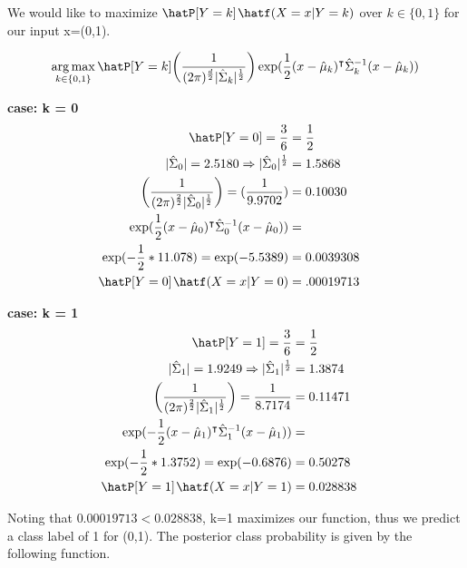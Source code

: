 \documentclass{jhwhw}
\newcommand{\Hat}[1]{\expandafter\hat#1}
\DeclareMathOperator*{\argmax}{arg\,max}
\begin{document}
    \bigbreak
    We would like to maximize $\Hat{P}[Y=k]\hspace{1pt}\Hat{f}(X=x|Y=k)$ 
	over $k\in\{0,1\}$ for our input x=(0,1).

    $$
	\argmax_{k\in\{0,1\}} 
	\Hat{P}[Y=k]
	\biggr(\frac{1}{(2\pi)^{\frac{d}{2}}{|\Hat{\Sigma}_k}|^{\frac{1}{2}}}\biggr)
	\exp(\frac{1}{2}(x - \Hat{\mu}_k)^\intercal \Hat{\Sigma}_k^{-1} (x - \Hat{\mu}_k))
    $$

    \textbf{case: k = 0} \\

    \begin{align*}
	\Hat{P}[Y=0] = \frac{3}{6} &= \frac{1}{2} &\\
	|\Hat{\Sigma}_0| = 2.5180 \Rightarrow |\Hat{\Sigma}_0|^{\frac{1}{2}} &= 1.5868 &\\
	\biggr(\frac{1}{(2\pi)^{\frac{2}{2}}{|\Hat{\Sigma}_0}|^{\frac{1}{2}}}\biggr) =
	    (\frac{1}{9.9702}) &= 0.10030 &\\
	\exp(\frac{1}{2}(x - \Hat{\mu}_0)^\intercal \Hat{\Sigma}_0^{-1} (x - \Hat{\mu}_0)) &=  &\\
	    \exp(-\frac{1}{2} * 11.078) = \exp(-5.5389) &= 0.0039308 &\\
	\Hat{P}[Y=0]\hspace{1pt}\Hat{f}(X=x|Y=0) &= .00019713
    \end{align*}

    \textbf{case: k = 1} \\

    \begin{align*}
	\Hat{P}[Y=1] = \frac{3}{6} &= \frac{1}{2} &\\
	|\Hat{\Sigma}_1| = 1.9249 \Rightarrow |\Hat{\Sigma}_1|^{\frac{1}{2}} &= 1.3874 &\\
	\biggr(\frac{1}{(2\pi)^{\frac{2}{2}}{|\Hat{\Sigma}_1}|^{\frac{1}{2}}}\biggr) =
	    \frac{1}{8.7174} &= 0.11471 &\\
	\exp(-\frac{1}{2}(x - \Hat{\mu}_1)^\intercal \Hat{\Sigma}_1^{-1} (x - \Hat{\mu}_1)) &= &\\
	    \exp(-\frac{1}{2} * 1.3752) = \exp(-0.6876) &= 0.50278 &\\
	\Hat{P}[Y=1]\hspace{1pt}\Hat{f}(X=x|Y=1) &= 0.028838
    \end{align*}

    \clearpage
    Noting that $0.00019713 < 0.028838$, k=1 maximizes our function, thus we 
    predict a class label of 1 for (0,1).
    The posterior class probability is given by the following function.
\end{document}
